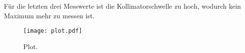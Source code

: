 
Für die letzten drei Messwerte ist die Kollimatorschwelle zu hoch, wodurch kein Maximum mehr zu messen ist.



\begin{figure}
  \centering
  \texttt{[image: plot.pdf]}
  \caption{Plot.}
  \label{fig:plot}
\end{figure}
